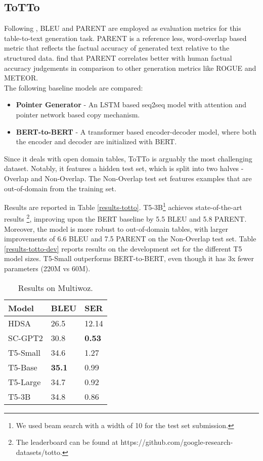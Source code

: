 \documentclass[11pt,a4paper]{article}
\begin{document}
\subsection{ToTTo}
Following \cite{parikh2020totto}, BLEU and PARENT are employed as evaluation metrics for this table-to-text generation task. PARENT is a reference less, word-overlap based metric that reflects the factual accuracy of generated text relative to the structured data. \citet{dhingra2019handling} find that PARENT correlates better with human factual accuracy judgements in comparison to other generation metrics like ROGUE \cite{lin2004rouge} and METEOR.  \\
The following baseline models are compared:
\begin{itemize}
    \item \textbf{Pointer Generator} \cite{see2017get} - An LSTM based seq2seq model with attention and pointer network based copy mechanism.
    \item \textbf{BERT-to-BERT} \cite{rothe2019leveraging} - A transformer based encoder-decoder model, where both the encoder and decoder are initialized with BERT.
\end{itemize}
\par Since it deals with open domain tables, ToTTo is arguably the most challenging dataset. Notably, it features a hidden test set, which is split into two halves - Overlap and Non-Overlap. The Non-Overlap test set features examples that are out-of-domain from the training set. \par Results are reported in Table \ref{results-totto}. T5-3B\footnote{We used beam search with a width of 10 for the test set submission.} achieves state-of-the-art results \footnote{The leaderboard can be found at https://github.com/google-research-datasets/totto.}, improving upon the BERT baseline by 5.5 BLEU and 5.8 PARENT. Moreover, the model is more robust to out-of-domain tables, with larger improvements of 6.6 BLEU and 7.5 PARENT on the Non-Overlap test set. Table \ref{results-totto-dev} reports results on the development set for the different T5 model sizes. T5-Small outperforms BERT-to-BERT, even though it has 3x fewer parameters (220M vs 60M).




\begin{table}[h]
\centering
\begin{tabular}{lll} \hline
Model    & BLEU                         & SER                         \\ \hline
HDSA      & 26.5                        & 12.14                       \\
SC-GPT2  & 30.8                        & \textbf{0.53}                        \\ \hline
T5-Small & 34.6  & 1.27 \\
T5-Base  & \textbf{35.1} & 0.99 \\ 
T5-Large & 34.7 & 0.92 \\
T5-3B    & 34.8 & 0.86 \\ \hline
\end{tabular}
\caption{Results on Multiwoz. \cite{chen2019semantically} }
\label{results-multiwoz}
\end{table}
\end{document}
